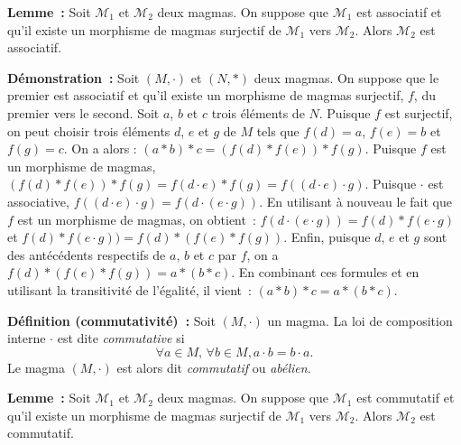 \medskip

\noindent\textbf{Lemme :} Soit $\mathcal{M}_1$ et $\mathcal{M}_2$ deux magmas.
    On suppose que $\mathcal{M}_1$ est associatif et qu'il existe un morphisme de magmas surjectif de $\mathcal{M}_1$ vers $\mathcal{M}_2$.
    Alors $\mathcal{M}_2$ est associatif.

\medskip

\noindent\textbf{Démonstration :} Soit $(M,\cdot)$ et $(N,\ast)$ deux magmas. 
    On suppose que le premier est associatif et qu'il existe un morphisme de magmas surjectif, $f$, du premier vers le second. 
    Soit $a$, $b$ et $c$ trois éléments de $N$. 
    Puisque $f$ est surjectif, on peut choisir trois éléments $d$, $e$ et $g$ de $M$ tels que $f(d) = a$, $f(e) = b$ et $f(g) = c$.
    On a alors : $(a \ast b) \ast c = (f(d) \ast f(e)) \ast f(g)$.
    Puisque $f$ est un morphisme de magmas, $(f(d) \ast f(e)) \ast f(g) = f(d \cdot e) \ast f(g) = f((d \cdot e) \cdot g)$.
    Puisque $\cdot$ est associative, $f((d \cdot e) \cdot g) = f(d \cdot (e \cdot g))$. 
    En utilisant à nouveau le fait que $f$ est un morphisme de magmas, on obtient : $f(d \cdot (e \cdot g)) = f(d) \ast f(e \cdot g)$ et $f(d) \ast f(e \cdot g)) = f(d) \ast (f(e) \ast f(g))$. 
    Enfin, puisque $d$, $e$ et $g$ sont des antécédents respectifs de $a$, $b$ et $c$ par $f$, on a $f(d) \ast (f(e) \ast f(g)) = a \ast (b \ast c)$. 
    En combinant ces formules et en utilisant la transitivité de l'égalité, il vient : $(a \ast b) \ast c = a \ast (b \ast c)$.

    \hfill \square

\medskip

\noindent\textbf{Définition (commutativité) :} Soit $(M,\cdot)$ un magma.
    La loi de composition interne $\cdot$ est dite \textit{commutative} si
    \begin{equation*}
        \forall a \in M, \, \forall b \in M,  
        a \cdot b = b \cdot a.
    \end{equation*}
    Le magma $(M, \cdot)$ est alors dit \textit{commutatif} ou \textit{abélien}.

\medskip

\noindent\textbf{Lemme :} Soit $\mathcal{M}_1$ et $\mathcal{M}_2$ deux magmas.
    On suppose que $\mathcal{M}_1$ est commutatif et qu'il existe un morphisme de magmas surjectif de $\mathcal{M}_1$ vers $\mathcal{M}_2$.
    Alors $\mathcal{M}_2$ est commutatif.

\medskip

